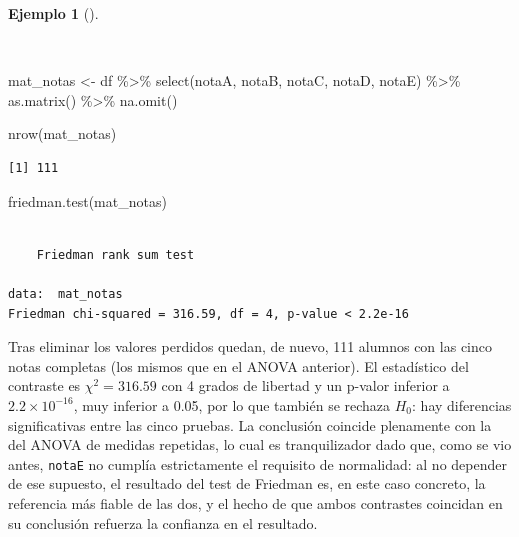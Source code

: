 \documentclass[
  spanish,
  a4paper,
]{scrreport}
\newenvironment{Shaded}{\begin{snugshade}}{\end{snugshade}}
\newcommand{\FunctionTok}[1]{\textcolor[rgb]{0.28,0.35,0.67}{#1}}
\newcommand{\NormalTok}[1]{\textcolor[rgb]{0.00,0.23,0.31}{#1}}
\newcommand{\OtherTok}[1]{\textcolor[rgb]{0.00,0.23,0.31}{#1}}
\newcommand{\SpecialCharTok}[1]{\textcolor[rgb]{0.37,0.37,0.37}{#1}}
\theoremstyle{definition}
\newtheorem{example}{Ejemplo}[chapter]
\theoremstyle{definition}
\theoremstyle{remark}
\begin{document}
\begin{example}[]\protect\hypertarget{exm-medidasrepetidas-friedman}{}\label{exm-medidasrepetidas-friedman}

~

\begin{Shaded}
\begin{Highlighting}[]
\NormalTok{mat\_notas }\OtherTok{\textless{}{-}}\NormalTok{ df }\SpecialCharTok{\%\textgreater{}\%}
  \FunctionTok{select}\NormalTok{(notaA, notaB, notaC, notaD, notaE) }\SpecialCharTok{\%\textgreater{}\%}
  \FunctionTok{as.matrix}\NormalTok{() }\SpecialCharTok{\%\textgreater{}\%}
  \FunctionTok{na.omit}\NormalTok{()}

\FunctionTok{nrow}\NormalTok{(mat\_notas)}
\end{Highlighting}
\end{Shaded}

\begin{verbatim}
[1] 111
\end{verbatim}

\begin{Shaded}
\begin{Highlighting}[]
\FunctionTok{friedman.test}\NormalTok{(mat\_notas)}
\end{Highlighting}
\end{Shaded}

\begin{verbatim}

    Friedman rank sum test

data:  mat_notas
Friedman chi-squared = 316.59, df = 4, p-value < 2.2e-16
\end{verbatim}

Tras eliminar los valores perdidos quedan, de nuevo, 111 alumnos con las
cinco notas completas (los mismos que en el ANOVA anterior). El
estadístico del contraste es \(\chi^2=316.59\) con 4 grados de libertad
y un p-valor inferior a \(2.2\times10^{-16}\), muy inferior a 0.05, por
lo que también se rechaza \(H_0\): hay diferencias significativas entre
las cinco pruebas. La conclusión coincide plenamente con la del ANOVA de
medidas repetidas, lo cual es tranquilizador dado que, como se vio
antes, \texttt{notaE} no cumplía estrictamente el requisito de
normalidad: al no depender de ese supuesto, el resultado del test de
Friedman es, en este caso concreto, la referencia más fiable de las dos,
y el hecho de que ambos contrastes coincidan en su conclusión refuerza
la confianza en el resultado.

\end{example}
\end{document}

